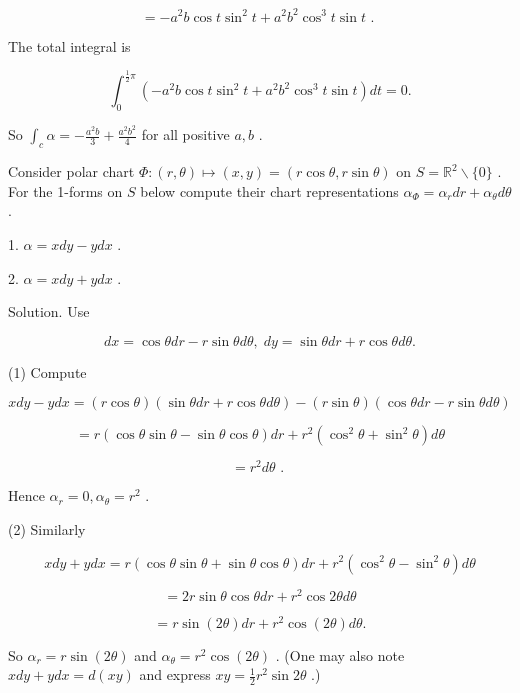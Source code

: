 \documentclass[10pt]{article}
\begin{document}
\[
=  - {a}^{2}b\cos t{\sin }^{2}t + {a}^{2}{b}^{2}{\cos }^{3}t\sin t\text{ . }
\]

The total integral is

\[
{\int }_{0}^{\frac{1}{2}\pi }\left( {-{a}^{2}b\cos t{\sin }^{2}t + {a}^{2}{b}^{2}{\cos }^{3}t\sin t}\right) {dt} = 0.
\]

So \({\int }_{c}\alpha  =  - \frac{{a}^{2}b}{3} + \frac{{a}^{2}{b}^{2}}{4}\) for all positive \(a,b\) .

\begin{problem}[title=PROBLEM 4 (4 POINTS)]
Consider polar chart \(\Phi  : \left( {r,\theta }\right)  \mapsto  \left( {x,y}\right)  = \left( {r\cos \theta ,r\sin \theta }\right)\) on \(S = {\mathbb{R}}^{2} \smallsetminus  \{ 0\}\) . For the 1-forms on \(S\) below compute their chart representations \({\alpha }_{\Phi } = {\alpha }_{r}{dr} + {\alpha }_{\theta }{d\theta }\) .

1. \(\alpha  = {xdy} - {ydx}\) .

2. \(\alpha  = {xdy} + {ydx}\) .
\end{problem}

Solution. Use

\[
{dx} = \cos {\theta dr} - r\sin {\theta d\theta },\;{dy} = \sin {\theta dr} + r\cos {\theta d\theta }.
\]

(1) Compute

\[
{xdy} - {ydx} = \left( {r\cos \theta }\right) \left( {\sin {\theta dr} + r\cos {\theta d\theta }}\right)  - \left( {r\sin \theta }\right) \left( {\cos {\theta dr} - r\sin {\theta d\theta }}\right)
\]

\[
= r\left( {\cos \theta \sin \theta  - \sin \theta \cos \theta }\right) {dr} + {r}^{2}\left( {{\cos }^{2}\theta  + {\sin }^{2}\theta }\right) {d\theta }
\]

\[
= {r}^{2}{d\theta }\text{ . }
\]

Hence \({\alpha }_{r} = 0,{\alpha }_{\theta } = {r}^{2}\) .

(2) Similarly

\[
{xdy} + {ydx} = r\left( {\cos \theta \sin \theta  + \sin \theta \cos \theta }\right) {dr} + {r}^{2}\left( {{\cos }^{2}\theta  - {\sin }^{2}\theta }\right) {d\theta }
\]

\[
= {2r}\sin \theta \cos {\theta dr} + {r}^{2}\cos {2\theta d\theta }
\]

\[
= r\sin \left( {2\theta }\right) {dr} + {r}^{2}\cos \left( {2\theta }\right) {d\theta }.
\]

So \({\alpha }_{r} = r\sin \left( {2\theta }\right)\) and \({\alpha }_{\theta } = {r}^{2}\cos \left( {2\theta }\right)\) . (One may also note \({xdy} + {ydx} = d\left( {xy}\right)\) and express \({xy} = \frac{1}{2}{r}^{2}\sin {2\theta }\) .)
\end{document}
